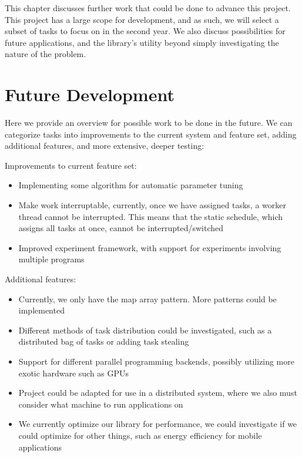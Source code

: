 
This chapter discusses further work that could be done to advance this project. This project has a large scope for development, and as such, we will select a subset of tasks to focus on in the second year. We also discuss possibilities for future applications, and the library's
 utility beyond simply investigating the nature of the problem.



\section{Future Development}

Here we provide an overview for possible work to be done in the future. We can categorize tasks into improvements to the current system and feature set, adding additional features, and more extensive, deeper testing:

Improvements to current feature set:

\begin{itemize}
	\item Implementing some algorithm for automatic parameter tuning
	\item Make work interruptable, currently, once we have assigned tasks, a worker thread cannot be interrupted. This means that the static schedule, which assigns all tasks at once, cannot be interrupted/switched
	\item Improved experiment framework, with support for experiments involving multiple programs
\end{itemize}

Additional features:

\begin{itemize}
	\item Currently, we only have the map array pattern. More patterns could be implemented
	\item Different methods of task distribution could be investigated, such as a distributed bag of tasks or adding task stealing
	\item Support for different parallel programming backends, possibly utilizing more exotic hardware such as GPUs 
	\item Project could be adapted for use in a distributed system, where we also must consider what machine to run applications on
	\item We currently optimize our library for performance, we could investigate if we could optimize for other things, such as energy efficiency for mobile applications
\end{itemize}

